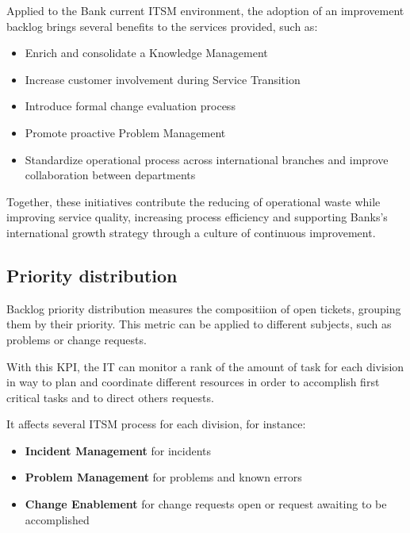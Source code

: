 Applied to the Bank current ITSM environment, the adoption of an improvement backlog brings several benefits to the services provided, such as:

\begin{itemize}
    \item Enrich and consolidate a Knowledge Management
    \item Increase customer involvement during Service Transition
    \item Introduce formal change evaluation process 
    \item Promote proactive Problem Management
    \item Standardize operational process across international branches and improve collaboration between departments
\end{itemize}

Together, these initiatives contribute the reducing of operational waste while improving service quality, increasing process efficiency and supporting Banks's international growth strategy through a culture of continuous improvement.


\subsection{Priority distribution}
\label{sub:prioritydistribution}
Backlog priority distribution measures the compositiion of open tickets, grouping them by their priority. This metric can be applied to different subjects, such as problems or change requests.

With this KPI, the IT can monitor a rank of the amount of task for each division in way to plan and coordinate different resources in order to accomplish first critical tasks and to direct others requests.

It affects several ITSM process for each division, for instance:

\begin{itemize}
    \item \textbf{Incident Management} for incidents 
    \item \textbf{Problem Management} for problems and known errors
    \item \textbf{Change Enablement} for change requests open or request awaiting to be accomplished
\end{itemize}

